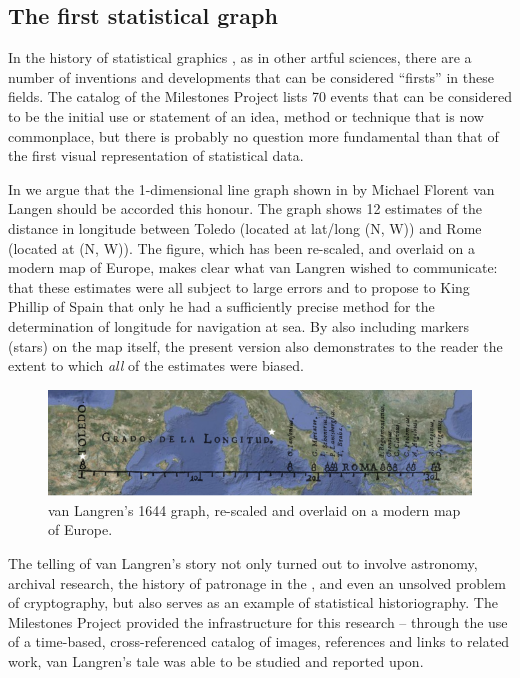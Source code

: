 \subsection{The first statistical graph}
In the history of statistical graphics \citep{Friendly:06:hbook}, as in other 
artful sciences, there are a number of inventions and developments that can be 
considered ``firsts'' in these fields.
The catalog of the Milestones Project \citep{FriendlyDenis:01} lists 70 events 
that can be considered to be the initial use or statement of an idea, method or 
technique that is now commonplace, but there is probably no question more 
fundamental than that of the first visual representation of statistical data.

In \citet{Friendly-etal:2010:langren} we argue that the 1-dimensional line 
graph shown in  by Michael Florent van 
Langen \citep{Langren:1644} should be accorded this honour. The graph shows 12 estimates of the distance in longitude between Toledo (located at lat/long %
(N, W)) and Rome (located at (N, W)).  The figure, which has been re-scaled, and overlaid on a modern map of Europe, makes clear what van Langren wished to communicate: that these estimates were all subject to large errors and to propose to King Phillip of Spain that only he had a sufficiently precise method for the determination of longitude for navigation at sea.  By also including markers (stars) on the map itself, the present version also demonstrates to the reader the extent to which \emph{all} of the estimates were biased.

\begin{figure}[htb]
 \centering
 \includegraphics[width=\textwidth]{fig/langren-google-overlay2}
 \caption{van Langren's 1644 graph, re-scaled and overlaid on a modern map of Europe.}%
\label{fig:langren-google-overlay}
\end{figure}

The telling of van Langren's story not only turned out to involve astronomy, 
archival research, the history of patronage in the , and even an 
unsolved problem of cryptography, but also serves as an example of statistical 
historiography.
The Milestones Project provided the infrastructure for this research -- through 
the use of a time-based, cross-referenced catalog of images, references and 
links to related work, van Langren's tale was able to be studied and reported 
upon.

